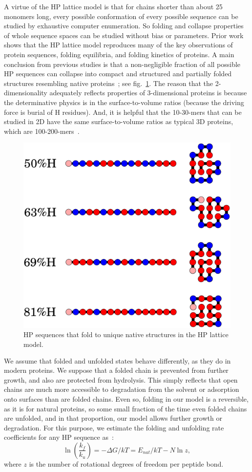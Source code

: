 \documentclass[5p,times]{elsarticle}
\newcommand*{\gD}{\Delta}
\newcommand*{\pt}[1]{\left( #1\right)}
\begin{document}
 A virtue of the HP lattice model is that for chains shorter than about 25 monomers long, every 
possible conformation of every possible sequence can be studied by exhaustive computer enumeration. 
 So folding and collapse properties of whole sequence spaces can be studied without bias or 
parameters.  Prior work shows that the HP lattice model reproduces many of the key observations of 
protein sequences, folding equilibria, and folding kinetics of proteins\cite{Dill1999}.  A main 
conclusion from previous studies is 
that a non-negligible fraction of all possible HP sequences can collapse into compact and 
structured and partially folded structures resembling native proteins~\cite{lau1989lattice}; see 
fig.~\ref{fig:hydro-effect}.  The reason that the 2-dimensionality adequately reflects properties 
of 3-dimensional proteins is because the determinative physics is in the surface-to-volume ratios 
(because the driving force is burial of H residues).  And, it is helpful that the 10-30-mers that 
can be studied in 2D have the same surface-to-volume ratios as typical 3D proteins, which are 
100-200-mers~\cite{Giugliarelli2000}.
\begin{figure}[h!]
  \centering
  \includegraphics[width=0.8\columnwidth]{pictures/tst-seqs.pdf} 
  \caption{\footnotesize{HP sequences that fold to unique native structures in the HP 
lattice model.}}
  \label{fig:hydro-effect}
\end{figure}

 We assume that folded and unfolded states behave differently, as they do in modern proteins.  We 
suppose that a folded chain is prevented from further growth, and also are protected from 
hydrolysis.  This simply reflects that open chains are much more accessible to degradation from the 
solvent or adsorption onto surfaces than are folded chains.  Even so, folding in our model is a 
reversible, as it is for natural proteins, so some small fraction of the time even folded chains 
are unfolded, and in that proportion, our model allows further growth or degradation.  For this 
purpose, we estimate the folding and unfolding rate coefficients for any HP sequence 
as~\cite{Ghosh2009}:
\begin{equation}
 \ln\pt{\frac{k_f}{k_u}}=-\gD G/kT = E_{nat}/kT-N\ln z,
\end{equation} 
 where $z$ is the number of rotational degrees of freedom per peptide bond.
 
\end{document}
